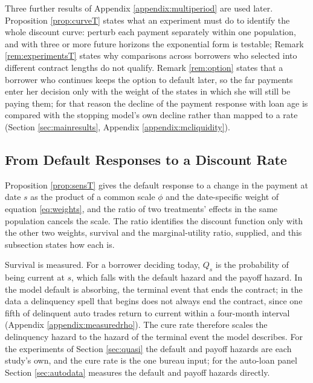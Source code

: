 Three further results of Appendix \ref{appendix:multiperiod} are used later. Proposition \ref{prop:curveT} states what an experiment must do to identify the whole discount curve: perturb each payment separately within one population, and with three or more future horizons the exponential form is testable; Remark \ref{rem:experimentsT} states why comparisons across borrowers who selected into different contract lengths do not qualify. Remark \ref{rem:option} states that a borrower who continues keeps the option to default later, so the far payments enter her decision only with the weight of the states in which she will still be paying them; for that reason the decline of the payment response with loan age is compared with the stopping model's own decline rather than mapped to a rate (Section \ref{sec:mainresults}, Appendix \ref{appendix:mcliquidity}).

\subsection{From Default Responses to a Discount Rate}\label{sec:mapping}

Proposition \ref{prop:sensT} gives the default response to a change in the payment at date $s$ as the product of a common scale $\phi$ and the date-specific weight of equation \eqref{eq:weights}, and the ratio of two treatments' effects in the same population cancels the scale. The ratio identifies the discount function only with the other two weights, survival and the marginal-utility ratio, supplied, and this subsection states how each is.

Survival is measured. For a borrower deciding today, $Q_s$ is the probability of being current at $s$, which falls with the default hazard and the payoff hazard. In the model default is absorbing, the terminal event that ends the contract; in the data a delinquency spell that begins does not always end the contract, since one fifth of delinquent auto trades return to current within a four-month interval (Appendix \ref{appendix:measuredrho}). The cure rate therefore scales the delinquency hazard to the hazard of the terminal event the model describes. For the experiments of Section \ref{sec:quasi} the default and payoff hazards are each study's own, and the cure rate is the one bureau input; for the auto-loan panel Section \ref{sec:autodata} measures the default and payoff hazards directly.

